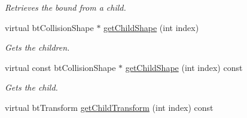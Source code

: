 \begin{CompactItemize}
\begin{CompactList}\small\item\em Retrieves the bound from a child. \item\end{CompactList}\item 
\hypertarget{classbt_g_impact_mesh_shape_e268fb9f2813b1fa4171d87e201c37a7}{
virtual btCollisionShape $\ast$ \hyperlink{classbt_g_impact_mesh_shape_e268fb9f2813b1fa4171d87e201c37a7}{getChildShape} (int index)}
\label{classbt_g_impact_mesh_shape_e268fb9f2813b1fa4171d87e201c37a7}

\begin{CompactList}\small\item\em Gets the children. \item\end{CompactList}\item 
\hypertarget{classbt_g_impact_mesh_shape_476d81e3da36410bb96da37599dfdbb0}{
virtual const btCollisionShape $\ast$ \hyperlink{classbt_g_impact_mesh_shape_476d81e3da36410bb96da37599dfdbb0}{getChildShape} (int index) const }
\label{classbt_g_impact_mesh_shape_476d81e3da36410bb96da37599dfdbb0}

\begin{CompactList}\small\item\em Gets the child. \item\end{CompactList}\item 
\hypertarget{classbt_g_impact_mesh_shape_40f77ee9ac94d20af03c068a76b231ec}{
virtual btTransform \hyperlink{classbt_g_impact_mesh_shape_40f77ee9ac94d20af03c068a76b231ec}{getChildTransform} (int index) const }
\label{classbt_g_impact_mesh_shape_40f77ee9ac94d20af03c068a76b231ec}


\end{CompactItemize}
